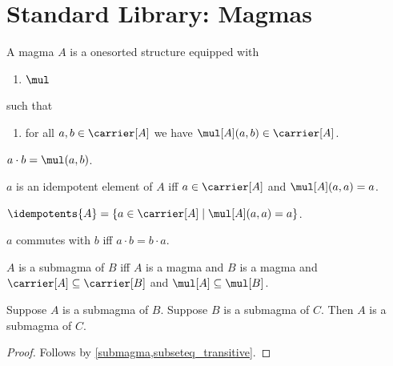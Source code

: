 \section{Standard Library: Magmas}

\begin{struct}\label{magma}
    A magma $A$ is a onesorted structure equipped with
    \begin{enumerate}
        \item $\mul$
    \end{enumerate}
    such that
    \begin{enumerate}
        \item\label{magma_welldef} for all $a, b\in \carrier[A]$ we have $\mul[A](a,b)\in \carrier[A]$.
    \end{enumerate}
\end{struct}

\begin{abbreviation}\label{cdot}
    $a\cdot b = \mul(a,b)$.
\end{abbreviation}

\begin{abbreviation}\label{idempotentelement}
    $a$ is an idempotent element of $A$ iff
    $a\in\carrier[A]$ and
    $\mul[A](a,a) = a$.
\end{abbreviation}


\begin{definition}\label{idempotents}
    $\idempotents{A} = \{a\in\carrier[A]\mid \mul[A](a,a) = a\}$.
\end{definition}


\begin{abbreviation}\label{commutes}
    $a$ commutes with $b$ iff $a\cdot b = b\cdot a$.
\end{abbreviation}

\begin{definition}\label{submagma}
    $A$ is a submagma of $B$ iff
        $A$ is a magma and
        $B$ is a magma and
        $\carrier[A]\subseteq \carrier[B]$ and
        $\mul[A]\subseteq \mul[B]$.
\end{definition}

\begin{proposition}\label{submagma_transitive}
    Suppose $A$ is a submagma of $B$.
    Suppose $B$ is a submagma of $C$.
    Then $A$ is a submagma of $C$.
\end{proposition}
\begin{proof}
    Follows by \cref{submagma,subseteq_transitive}.
\end{proof}


